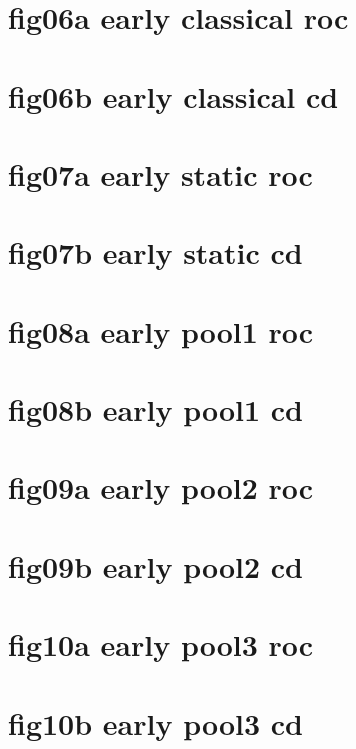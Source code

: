 \documentclass{article}
\begin{document}
\section*{fig06a early classical roc}
\resizebox{\linewidth}{!}{}
\clearpage
\section*{fig06b early classical cd}
\resizebox{\linewidth}{!}{}
\clearpage
\section*{fig07a early static roc}
\resizebox{\linewidth}{!}{}
\clearpage
\section*{fig07b early static cd}
\resizebox{\linewidth}{!}{}
\clearpage
\section*{fig08a early pool1 roc}
\resizebox{\linewidth}{!}{}
\clearpage
\section*{fig08b early pool1 cd}
\resizebox{\linewidth}{!}{}
\clearpage
\section*{fig09a early pool2 roc}
\resizebox{\linewidth}{!}{}
\clearpage
\section*{fig09b early pool2 cd}
\resizebox{\linewidth}{!}{}
\clearpage
\section*{fig10a early pool3 roc}
\resizebox{\linewidth}{!}{}
\clearpage
\section*{fig10b early pool3 cd}
\resizebox{\linewidth}{!}{}
\clearpage
\end{document}
